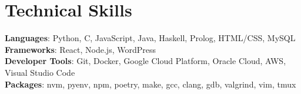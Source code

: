 \documentclass[letterpaper,11pt]{article}
\begin{document}
%
\section{Technical Skills}
 \begin{itemize}[leftmargin=0.15in, label={}]
    \small{\item{
     \textbf{Languages}{: Python, C, JavaScript, Java, Haskell, Prolog, HTML/CSS, MySQL} \\
     \textbf{Frameworks}{: React, Node.js, WordPress} \\
     \textbf{Developer Tools}{: Git, Docker, Google Cloud Platform, Oracle Cloud, AWS, Visual Studio Code} \\
     \textbf{Packages}{: nvm, pyenv, npm, poetry, make, gcc, clang, gdb, valgrind, vim, tmux}
    }}
 \end{itemize}


\end{document}
